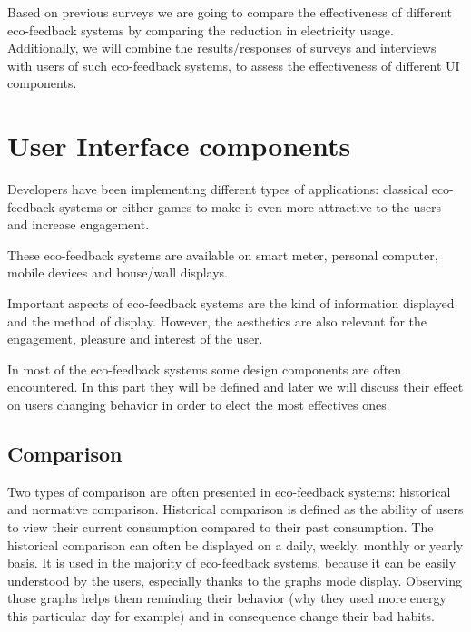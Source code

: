 \documentclass[journal]{vgtc}                %
\begin{document}
Based on previous surveys we are going to compare the effectiveness of different eco-feedback systems by comparing the reduction in electricity usage. Additionally, we will combine the results/responses of surveys and interviews with users of such eco-feedback systems, to assess the effectiveness of different UI components. 
%


\section{User Interface components}
Developers have been implementing different types of applications: classical eco-feedback systems or either games %
to make it even more attractive to the users and increase engagement.

These eco-feedback systems are available on smart meter, personal computer, mobile devices and house/wall displays. %

Important aspects of eco-feedback systems are the kind of information displayed and the method of display. However, the aesthetics are also relevant for the engagement, pleasure and interest of the user\cite{bartram2015design}.

In most of the eco-feedback systems some design components are often encountered.
In this part they will be defined and later we will discuss their effect on users changing behavior in order to elect the most effectives ones. 

\subsection{Comparison }
Two types of comparison are often presented in eco-feedback systems: historical and normative comparison.
Historical comparison is defined as the ability of users to view their current consumption compared to their past consumption. %
The historical comparison can often be displayed on a daily, weekly, monthly or yearly basis. It is used in the majority of eco-feedback systems, because it can be easily understood by the users, especially thanks to the graphs mode display. Observing those graphs helps them reminding their behavior (why they used more energy this particular day for example) and in consequence change their bad habits.
\end{document}
